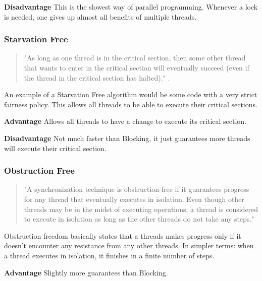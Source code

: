 \documentclass[letterpaper, 12pt]{article}
\begin{document}
{\bfseries Disadvantage}\newline
This is the slowest way of parallel programming. Whenever a lock is needed, one gives up 
almost all benefits of multiple threads.

\newpage
\subsubsection{Starvation Free}

\begin{quotation}
"As long as one thread is in the critical section, then some other thread that wants 
to enter in the critical section will eventually succeed (even if the thread in the 
critical section has halted)." \citep{artofmulti}.
\end{quotation}

An example of a Starvation Free algorithm would be some code with a very strict fairness 
policy. This allows all threads to be able to execute their critical sections.

{\bfseries Advantage}\newline
Allows all threads to have a change to execute its critical section.
\par\vspace{\baselineskip}

{\bfseries Disadvantage}\newline
Not much faster than Blocking, it just guarantees more threads will execute their critical section.

\subsubsection{Obstruction Free}

\begin{quotation}
"A synchronization technique is obstruction-free if it  guarantees progress for any 
thread that  eventually executes  in  isolation. Even  though other  threads  may  be  
in the  midst  of  executing operations,  a  thread  is  considered to execute in 
isolation as long as the other threads do not take any steps." \citep{obsfree}
\end{quotation}

Obstruction freedom basically states that a threads makes progress only if it doesn't encounter 
any resistance from any other threads. In simpler terms: when a thread executes in isolation, 
it finishes in a finite number of steps\citep{artofmulti}.

\par\vspace{\baselineskip}
{\bfseries Advantage}\newline
Slightly more guarantees than Blocking.
\par\vspace{\baselineskip}
\end{document}
